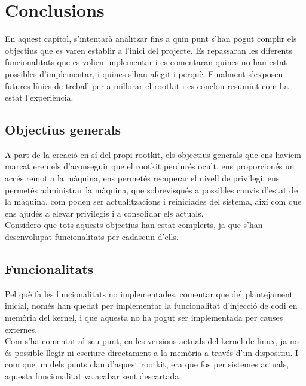 \chapter{Conclusions}

En aquest capítol, s'intentarà analitzar fins a quin punt s'han pogut complir els objectius que es varen 
establir a l'inici del projecte. Es repassaran les diferents funcionalitats que es volien implementar 
i es comentaran quines no han estat possibles d'implementar, i quines s'han afegit i perquè. Finalment
s'exposen futures línies de treball per a millorar el rootkit i es conclou resumint com ha estat 
l'experiència. \\

\section{Objectius generals}

A part de la creació en sí del propi rootkit, els objectius generals que ens havíem marcat eren els 
d'aconseguir que el rootkit perdurés ocult, ens proporcionés un accés remot a la màquina, ens permetés 
recuperar el nivell de privilegi, ens permetés administrar la màquina, que sobrevisqués a possibles 
canvis d'estat de la màquina, com poden ser actualitzacions i reiniciades del sistema, així com que 
ens ajudés a elevar privilegis i a consolidar els actuals. \\

Considero que tots aquests objectius han estat complerts, ja que s'han desenvolupat funcionalitats 
per cadascun d'ells.  \\

\section{Funcionalitats}

Pel què fa les funcionalitats no implementades, comentar que del plantejament inicial, només han quedat
per implementar la funcionalitat d'injecció de codi en memòria del kernel, i que aquesta no ha pogut
ser implementada per causes externes. \\

Com s'ha comentat al seu punt, en les versions actuals del kernel de linux, ja no és possible llegir 
ni escriure directament a la memòria a través d'un dispositiu. I com que un dels punts clau d'aquest 
rootkit, era que fos per sistemes actuals, aquesta funcionalitat va acabar sent descartada. \\


